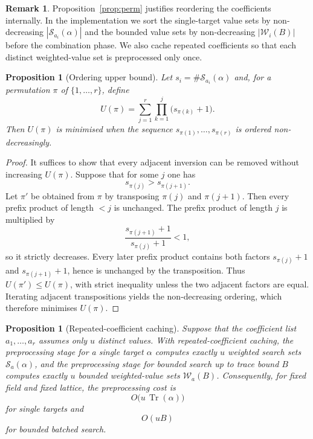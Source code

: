 \documentclass[manuscript]{acmart}
\theoremstyle{plain}
\newtheorem{proposition}[theorem]{Proposition}
\theoremstyle{definition}
\theoremstyle{nonitalicremark}
\newtheorem{remark}[theorem]{Remark}
\newcommand{\Tr}{\operatorname{Tr}}
\newcommand{\cS}{\mathcal{S}}
\newcommand{\cW}{\mathcal{W}}
\begin{document}
\begin{remark}\label{rem:ordering}
Proposition~\ref{prop:perm} justifies reordering the coefficients internally. In the implementation
we sort the single-target value sets by non-decreasing $|\cS_{a_i}(\alpha)|$ and the bounded value
sets by non-decreasing $|\cW_i(B)|$ before the combination phase. We also cache repeated coefficients
so that each distinct weighted-value set is preprocessed only once.
\end{remark}

\begin{proposition}[Ordering upper bound]\label{prop:ordering-upper}
Let $s_i=\#\cS_{a_i}(\alpha)$ and, for a permutation $\pi$ of $\{1,\dots,r\}$, define
\[
U(\pi)=\sum_{j=1}^r \prod_{k=1}^j \bigl(s_{\pi(k)}+1\bigr).
\]
Then $U(\pi)$ is minimised when the sequence $s_{\pi(1)},\dots,s_{\pi(r)}$ is ordered
non-decreasingly.
\end{proposition}

\begin{proof}
It suffices to show that every adjacent inversion can be removed without increasing $U(\pi)$. Suppose
that for some $j$ one has
\[
s_{\pi(j)} > s_{\pi(j+1)}.
\]
Let $\pi'$ be obtained from $\pi$ by transposing $\pi(j)$ and $\pi(j+1)$. Then every prefix product
of length $<j$ is unchanged. The prefix product of length $j$ is multiplied by
\[
\frac{s_{\pi(j+1)}+1}{s_{\pi(j)}+1}<1,
\]
so it strictly decreases. Every later prefix product contains both factors
$s_{\pi(j)}+1$ and $s_{\pi(j+1)}+1$, hence is unchanged by the transposition. Thus
$U(\pi')\le U(\pi)$, with strict inequality unless the two adjacent factors are equal. Iterating
adjacent transpositions yields the non-decreasing ordering, which therefore minimises $U(\pi)$.
\end{proof}

\begin{proposition}[Repeated-coefficient caching]\label{prop:caching}
Suppose that the coefficient list $a_1,\dots,a_r$ assumes only $u$ distinct values.
With repeated-coefficient caching, the preprocessing stage for a single target $\alpha$ computes
exactly $u$ weighted search sets $\cS_a(\alpha)$, and the preprocessing stage for bounded search up
to trace bound $B$ computes exactly $u$ bounded weighted-value sets $\cW_a(B)$.
Consequently, for fixed field and fixed lattice, the preprocessing cost is
\[
O\bigl(u\,\Tr(\alpha)\bigr)
\]
for single targets and
\[
O(uB)
\]
for bounded batched search.
\end{proposition}
\end{document}
